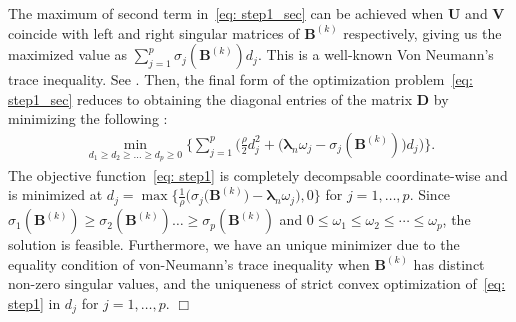 \documentclass[alpha-refs]{wiley-article}
\begin{document}
The maximum of second term in~\eqref{eq: step1_sec} can be achieved when $\boldsymbol{U}$ and $\boldsymbol{V}$ coincide with
left and right singular matrices of $\boldsymbol{B}^{(k)}$ respectively, giving us the maximized value as $\sum_{j=1}^{p}\sigma_{j}(\boldsymbol{B}^{(k)})d_{j}$.
This is a well-known Von Neumann's trace inequality.
See \cite{von1937some,mirsky1975trace}.
Then, the final form of the optimization problem~\eqref{eq: step1_sec} reduces to obtaining the diagonal entries of the matrix $\boldsymbol{D}$ by minimizing the following :
\begin{align}
    \min_{d_{1}\geq d_{2}\geq \dots \geq d_{p} \geq 0 }\bigg\{ \sum_{j=1}^{p} \bigg( \frac{\rho}{2} d_{j}^{2} + \big( \boldsymbol{\lambda}_{n} \omega_{j}-\sigma_{j}(\boldsymbol{B}^{(k)}) \big) d_{j} \bigg)  \bigg\}. \label{eq: step1}
\end{align}
The objective function~\eqref{eq: step1} is completely decompsable coordinate-wise and is minimized at $d_{j}=\max\big\{\frac{1}{\rho}\big(\sigma_{j}(\boldsymbol{B}^{(k)}\big)-\boldsymbol{\lambda}_{n} \omega_{j}\big),0 \big\}$ for $j=1,\dots,p$.
Since $\sigma_{1}(\boldsymbol{B}^{(k)})\geq\sigma_{2}(\boldsymbol{B}^{(k)})\dots\geq\sigma_{p}(\boldsymbol{B}^{(k)})$ and $0\leq\omega_{1}\leq\omega_{2}\leq\cdots\leq\omega_{p}$, the solution is feasible.
Furthermore, we have an unique minimizer due to the equality condition of von-Neumann's trace inequality when $\boldsymbol{B}^{(k)}$ has distinct non-zero singular values, and the uniqueness of strict convex optimization  of~\eqref{eq: step1} in $d_{j}$ for $j=1,\dots,p$.
\qquad \qquad \qquad \qquad \qquad \qquad \qquad \qquad \qquad \qquad \qquad \qquad \qquad \qquad \qquad \qquad
\qquad \qquad \qquad \qquad \qquad \qquad \quad \quad $\Box$
\end{document}
